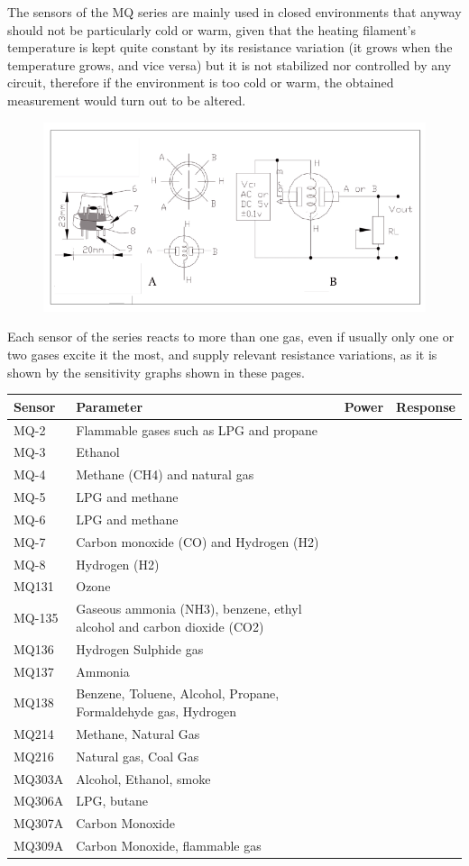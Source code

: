 \documentclass{article}\usepackage[]{graphicx}\usepackage[]{color}
\begin{document}
The sensors of the MQ series are mainly used in closed environments that anyway should not be particularly cold or warm, given that the heating filament's temperature is kept quite constant by its resistance variation (it grows when the temperature grows, and vice versa) but it is not stabilized nor controlled by any circuit, therefore if the environment is too cold or warm, the obtained measurement would turn out to be altered.

\begin{figure}
\includegraphics[width=1.0\textwidth]{MQ-X2.png}
\end{figure}

Each sensor of the series reacts to more than one gas, even if usually only one or two gases excite it the most, and supply relevant resistance variations, as it is shown by the sensitivity graphs shown in these pages.

\begin{table}
\begin{tabular}{lp{8cm}cc}\hline
Sensor  & Parameter       & Power   & Response \\ \hline\hline
MQ-2 & Flammable gases such as LPG and propane & & \\
MQ-3 & Ethanol && \\
MQ-4 & Methane (CH4) and natural gas && \\
MQ-5 & LPG and methane && \\
MQ-6 & LPG and methane && \\
MQ-7 & Carbon monoxide (CO) and Hydrogen (H2) && \\
MQ-8 & Hydrogen (H2) && \\
MQ131 & Ozone && \\
MQ-135 & Gaseous ammonia (NH3), benzene, ethyl alcohol and carbon dioxide (CO2) && \\
MQ136 & Hydrogen Sulphide gas  && \\
MQ137 & Ammonia  && \\
MQ138 & Benzene, Toluene, Alcohol, Propane, Formaldehyde gas, Hydrogen  && \\
MQ214 & Methane, Natural Gas  && \\
MQ216 & Natural gas, Coal Gas  && \\
MQ303A & Alcohol, Ethanol, smoke  && \\
MQ306A & LPG, butane  && \\
MQ307A &  Carbon Monoxide  && \\
MQ309A & Carbon Monoxide, flammable gas  && \\
\hline
\end{tabular}
\end{table}
\end{document}
